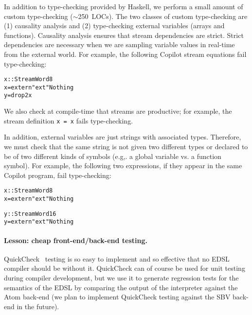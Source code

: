 \documentclass[preprint]{sigplanconf}
\newenvironment{code}{\begin{alltt}\footnotesize}{\end{alltt}}
\begin{document}


In addition to type-checking provided by Haskell, we perform a small amount of
custom type-checking ($\sim$250~LOCs).  The two classes of custom type-checking
are (1) causality analysis and (2) type-checking external variables (arrays and
functions).  Causality analysis ensures that stream dependencies are strict.
Strict dependencies are necessary when we are sampling variable values in
real-time from the external world.  For example, the following Copilot stream
equations fail type-checking:
%
\begin{code}
x :: Stream Word8
x = extern "ext" Nothing
y = drop 2 x 
\end{code}
%
We also check at compile-time that streams are productive; for example, the
stream definition {\tt x = x} fails type-checking.

In addition, external variables are just strings with associated types.
Therefore, we must check that the same string is not given two different types
or declared to be of two different kinds of symbols (e.g,. a global variable
vs. a function symbol).  For example, the following two expressions, if they
appear in the same Copilot program, fail type-checking:
%
\begin{code}
x :: Stream Word8
x = extern "ext" Nothing

y :: Stream Word16
y = extern "ext" Nothing
\end{code}



\paragraph{Lesson: cheap front-end/back-end testing.}

QuickCheck~\cite{qc} testing is so easy to implement and so effective that no
EDSL compiler should be without it.  QuickCheck can of course be used for unit
testing during compiler development, but we use it to generate regression tests
for the semantics of the EDSL by comparing the output of the interpreter against
the Atom back-end (we plan to implement QuickCheck testing against the SBV
back-end in the future).
\end{document}
